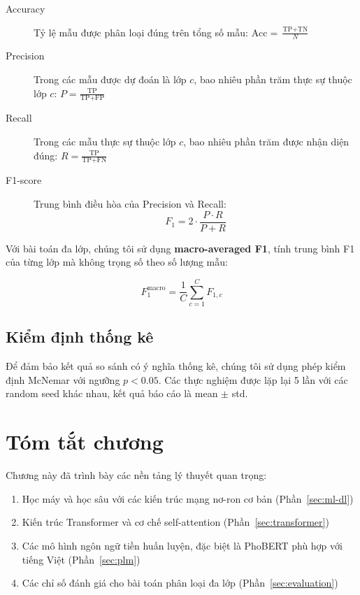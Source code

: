 \documentclass[12pt, a4paper]{report}
\begin{document}
\begin{description}
  \item[Accuracy] Tỷ lệ mẫu được phân loại đúng trên tổng số mẫu:
        $\text{Acc} = \frac{\text{TP} + \text{TN}}{N}$

  \item[Precision] Trong các mẫu được dự đoán là lớp $c$, bao nhiêu
        phần trăm thực sự thuộc lớp $c$:
        $P = \frac{\text{TP}}{\text{TP} + \text{FP}}$

  \item[Recall] Trong các mẫu thực sự thuộc lớp $c$, bao nhiêu phần
        trăm được nhận diện đúng:
        $R = \frac{\text{TP}}{\text{TP} + \text{FN}}$

  \item[F1-score] Trung bình điều hòa của Precision và Recall:
        \begin{equation}
          \label{eq:f1}
          F_1 = 2 \cdot \frac{P \cdot R}{P + R}
        \end{equation}
\end{description}

Với bài toán đa lớp, chúng tôi sử dụng \textbf{macro-averaged F1},
tính trung bình F1 của từng lớp mà không trọng số theo số lượng mẫu:

\begin{equation}
  \label{eq:macro-f1}
  F_1^{\text{macro}} = \frac{1}{C} \sum_{c=1}^{C} F_{1,c}
\end{equation}

\subsection{Kiểm định thống kê}

Để đảm bảo kết quả so sánh có ý nghĩa thống kê, chúng tôi sử dụng
phép kiểm định McNemar \cite{Goodfellow2016} với ngưỡng $p < 0.05$.
Các thực nghiệm được lặp lại 5 lần với các random seed khác nhau,
kết quả báo cáo là mean $\pm$ std.

\section{Tóm tắt chương}
\label{sec:summary}

Chương này đã trình bày các nền tảng lý thuyết quan trọng:

\begin{enumerate}
  \item Học máy và học sâu với các kiến trúc mạng nơ-ron cơ bản
        (Phần~\ref{sec:ml-dl})
  \item Kiến trúc Transformer và cơ chế self-attention
        (Phần~\ref{sec:transformer})
  \item Các mô hình ngôn ngữ tiền huấn luyện, đặc biệt là PhoBERT
        phù hợp với tiếng Việt (Phần~\ref{sec:plm})
  \item Các chỉ số đánh giá cho bài toán phân loại đa lớp
        (Phần~\ref{sec:evaluation})
\end{enumerate}
\end{document}
